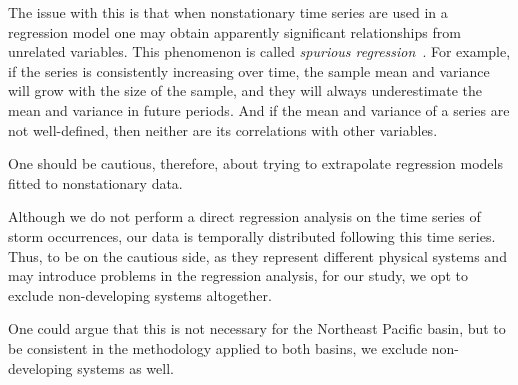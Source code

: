 The issue with this is that when nonstationary time series are used in a regression model one may obtain apparently significant relationships from unrelated variables. This phenomenon is called \emph{spurious regression}~\cite{Phillips1986}. For example, if the series is consistently increasing over time, the sample mean and variance will grow with the size of the sample, and they will always underestimate the mean and variance in future periods. And if the mean and variance of a series are not well-defined, then neither are its correlations with other variables.

One should be cautious, therefore, about trying to extrapolate regression models fitted to nonstationary data.

\bigskip
Although we do not perform a direct regression analysis on the time series of storm occurrences, our data is temporally distributed following this time series. Thus, to be on the cautious side, as they represent different physical systems and may introduce problems in the regression analysis, for our study, we opt to exclude non-developing systems altogether.

One could argue that this is not necessary for the Northeast Pacific basin, but to be consistent in the methodology applied to both basins, we exclude non-developing systems as well.
